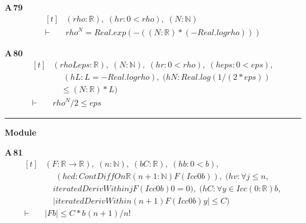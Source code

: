 \noindent\textbf{A\,79}\quad{}
{\footnotesize\[ \begin{aligned}[t]
&(\mathit{rho} : \mathbb{R} ),\; (\mathit{hr} : 0 < \mathit{rho}),\; (\mathit{N} : \mathbb{N} )\\
\vdash\;&\mathit{rho} ^{\mathit{N}} = \mathit{Real}.\mathit{exp} (-((\mathit{N} : \mathbb{R} ) * (-\mathit{Real}.\mathit{log} \mathit{rho})))
\end{aligned} \]}

\noindent\textbf{A\,80}\quad{}
{\footnotesize\[ \begin{aligned}[t]
&(\mathit{rho} \mathit{L} \mathit{eps} : \mathbb{R} ),\; (\mathit{N} : \mathbb{N} ),\; (\mathit{hr} : 0 < \mathit{rho}),\; (\mathit{heps} : 0 < \mathit{eps}),\\
&\quad \; (\mathit{hL} : \mathit{L} = -\mathit{Real}.\mathit{log} \mathit{rho}),\; (\mathit{hN} : \mathit{Real}.\mathit{log} (1 / (2 * \mathit{eps}))\\
&\quad \leq (\mathit{N} : \mathbb{R} ) * \mathit{L})\\
\vdash\;&\mathit{rho} ^{\mathit{N}} / 2 \leq \mathit{eps}
\end{aligned} \]}

\vspace{4pt}\noindent\rule{\columnwidth}{0.4pt}\par\vspace{2pt}
\noindent\textbf{Module }\par\vspace{3pt}

\noindent\textbf{A\,81}\quad{}
{\footnotesize\[ \begin{aligned}[t]
&(\mathit{F} : \mathbb{R} \to \mathbb{R} ),\; (\mathit{n} : \mathbb{N} ),\; (\mathit{b} \mathit{C} : \mathbb{R} ),\; (\mathit{hb} : 0 < \mathit{b}),\\
&\quad \; (\mathit{hcd} : \mathit{ContDiffOn} \mathbb{R} (\mathit{n} + 1 : \mathbb{N} ) \mathit{F} (\mathit{Icc} 0 \mathit{b})),\; (\mathit{hv} : \forall \mathit{j} \leq \mathit{n},\\
&\quad \mathit{iteratedDerivWithin} \mathit{j} \mathit{F} (\mathit{Icc} 0 \mathit{b}) 0 = 0),\; (\mathit{hC} : \forall \mathit{y} \in \mathit{Icc} (0:\mathbb{R} ) \mathit{b},\\
&\quad |\mathit{iteratedDerivWithin} (\mathit{n} + 1) \mathit{F} (\mathit{Icc} 0 \mathit{b}) \mathit{y}| \leq \mathit{C})\\
\vdash\;&|\mathit{F} \mathit{b}| \leq \mathit{C} * \mathit{b} ^{} (\mathit{n} + 1) / \mathit{n} !
\end{aligned} \]}

